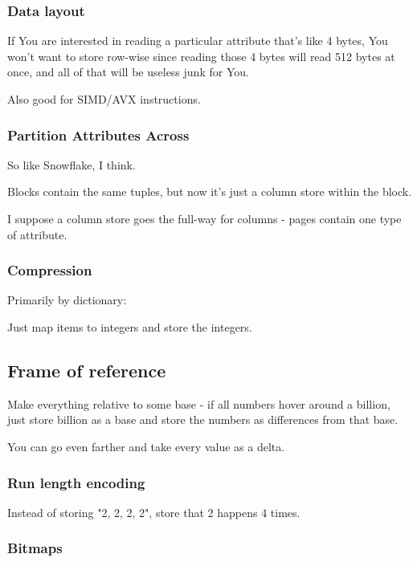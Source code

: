 \documentclass{article}
\begin{document}
			\subsubsection{Data layout}
			
				If You are interested in reading a particular attribute that's like 4 bytes, You won't want to store row-wise since reading those 4 bytes will read 512 bytes at once, and all of that will be useless junk for You.
				
				Also good for SIMD/AVX instructions.
				
			\subsubsection{Partition Attributes Across}
			
				So like Snowflake, I think.
				
				Blocks contain the same tuples, but now it's just a column store within the block.
				
				I suppose a column store goes the full-way for columns - pages contain one type of attribute.
				
			\subsubsection{Compression}
			
				Primarily by dictionary:
				
				Just map items to integers and store the integers.
				
			\subsection{Frame of reference}
			
				Make everything relative to some base - if all numbers hover around a billion, just store billion as a base and store the numbers as differences from that base.
				
				You can go even farther and take every value as a delta.
				
			\subsubsection{Run length encoding}
			
				Instead of storing "2, 2, 2, 2", store that 2 happens 4 times.
				
			\subsubsection{Bitmaps}
			
\end{document}
